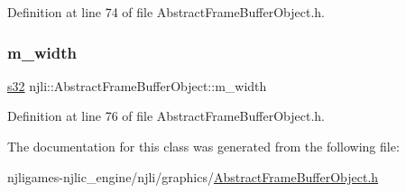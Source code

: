 Definition at line 74 of file Abstract\+Frame\+Buffer\+Object.\+h.

\mbox{\label{classnjli_1_1_abstract_frame_buffer_object_aa1664d2cb683746ddd76be458554c7bc}} 
\subsubsection{\texorpdfstring{m\+\_\+width}{m\_width}}
{\footnotesize\ttfamily \mbox{\hyperlink{_util_8h_aa62c75d314a0d1f37f79c4b73b2292e2}{s32}} njli\+::\+Abstract\+Frame\+Buffer\+Object\+::m\+\_\+width\hspace{0.3cm}{\ttfamily [private]}}



Definition at line 76 of file Abstract\+Frame\+Buffer\+Object.\+h.



The documentation for this class was generated from the following file\+:\begin{DoxyCompactItemize}
\item 
njligames-\/njlic\+\_\+engine/njli/graphics/\mbox{\hyperlink{_abstract_frame_buffer_object_8h}{Abstract\+Frame\+Buffer\+Object.\+h}}\end{DoxyCompactItemize}
